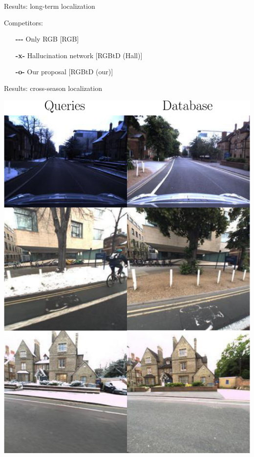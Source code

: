 \begin{frame}{Results: long-term localization}
\begin{minipage}{0.2\linewidth}
			\vspace{0.5cm}	
			{\scriptsize
			Competitors:
			\begin{itemize}
				\item[\textbf{-{}-{}-}] Only RGB [RGB]
				\item[\textbf{-x-}] Hallucination network [RGBtD (Hall)]
				\item[\textbf{-o-}] Our proposal [RGBtD (our)]
			\end{itemize}
			}
	\end{minipage}
\end{frame}

\begin{frame}{Results: cross-season localization}
	\begin{minipage}{0.27\linewidth}
			\includegraphics[width=\linewidth]{vect/res/dataset/snow_ex}
			\vfill


\end{minipage}
\end{frame}
